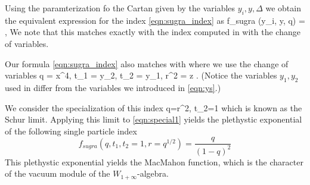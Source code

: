 Using the paramterization fo the Cartan given by the variables $y_i,y,\Delta$ we obtain the equivalent expression for the index \eqref{eqn:sugra_index} as 
\beqn
\label{eqn:Kim_sugra}
f_{sugra} (y_i, y, q) = ,
\eeqn
We note that this matches exactly with the index computed in \cite[Eq. (3.23)]{Kim:2013nva} with the change of variables.

Our formula \eqref{eqn:sugra_index} also matches with \cite[Eq. (3.24)]{Bhattacharya:2008zy} where we use the change of variables
\beqn
q = x^4, \quad t_1 = y_2, \quad t_2 = y_1, \quad r^2 = z .
\eeqn
(Notice the variables $y_1,y_2$ used in \cite{Bhattacharya:2008zy} differ from the variables we introduced in \eqref{eqn:ys}.)

\parsec 
We consider the specialization of this index 
\beqn
q=r^2, t_2=1 
\eeqn
which is known as the Schur limit.
Applying this limit to \eqref{eqn:special1} yields the plethystic exponential of the following single particle index
\[
f_{sugra}(q, t_1, t_2=1, r = q^{1/2}) = \frac{q}{(1-q)^2}
\]
This plethystic exponential yields the MacMahon function, which is the character of the vacuum module of the $W_{1+\infty}$-algebra.

%
